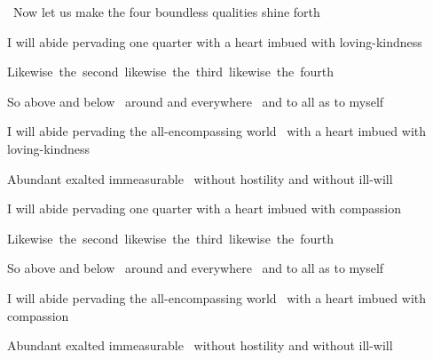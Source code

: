 \clearpage

\begin{leader-english}
  \anglebracketleft\ \hspace{-0.5mm}Now let us make the four boundless qualities shine forth \hspace{-0.5mm}\anglebracketright\
\end{leader-english}

\smallskip

\begin{english-hang}
  I will abide pervading one quarter with a heart imbued with loving-kindness
\end{english-hang}
\begin{english}
 Likewise~the~second~likewise~the~third~likewise~the~fourth
\end{english}
\begin{english-hang}
  So above and below \breathmark\ around and everywhere \breathmark\ and to all as to myself\makeatletter\hyperlink{endnote96-appendix}\makeatother\\
\end{english-hang}
\begin{english-hang}
  I will abide pervading the all-encompassing world \breathmark\ with a heart imbued with loving-kindness
\end{english-hang}
\begin{english-hang}
  Abundant exalted immeasurable \breathmark\ without hostility and without ill-will
\end{english-hang}

\medskip

\begin{english-hang}
  I will abide pervading one quarter with a heart imbued with compassion
\end{english-hang}
\begin{english-hang}
 Likewise~the~second~likewise~the~third~likewise~the~fourth
\end{english-hang}
\begin{english-hang}
  So above and below \breathmark\ around and everywhere \breathmark\ and to all as to myself
\end{english-hang}
\begin{english-hang}
  I will abide pervading the all-encompassing world \breathmark\ with a heart imbued with compassion
\end{english-hang}
\begin{english-hang}
  Abundant exalted immeasurable \breathmark\ without hostility and without ill-will
\end{english-hang}

